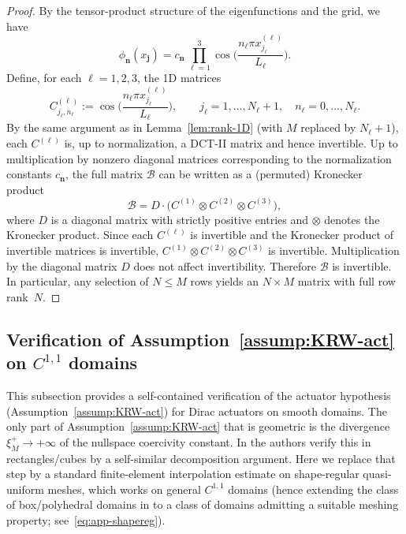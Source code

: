 \documentclass[11pt,a4paper]{article}
\numberwithin{equation}{section}
\theoremstyle{definition}
\newcommand{\1}{\mathbbm{1}}
\begin{document}
\begin{proof}
By the tensor-product structure of the eigenfunctions and the grid, we have
\[
\phi_{\mathbf{n}}(x_{\mathbf{j}})
= c_{\mathbf{n}}\,
\prod_{\ell=1}^3 \cos\!\Big(\frac{n_\ell\pi x^{(\ell)}_{j_\ell}}{L_\ell}\Big).
\]
Define, for each $\ell=1,2,3$, the 1D matrices
\[
C^{(\ell)}_{j_\ell,n_\ell}
:= \cos\!\Big(\frac{n_\ell\pi x^{(\ell)}_{j_\ell}}{L_\ell}\Big),
\qquad j_\ell=1,\dots,N_\ell+1,\quad n_\ell=0,\dots,N_\ell.
\]
By the same argument as in Lemma~\ref{lem:rank-1D} (with $M$ replaced by
$N_\ell+1$), each $C^{(\ell)}$ is, up to normalization, a DCT-II matrix and
hence invertible.
\newline
Up to multiplication by nonzero diagonal matrices corresponding to the
normalization constants $c_{\mathbf{n}}$, the full matrix $\mathcal{B}$ can
be written as a (permuted) Kronecker product
\[
\mathcal{B} = D \cdot\big(C^{(1)}\otimes C^{(2)}\otimes C^{(3)}\big),
\]
where $D$ is a diagonal matrix with strictly positive entries and
$\otimes$ denotes the Kronecker product. Since each $C^{(\ell)}$ is
invertible and the Kronecker product of invertible matrices is invertible,
$C^{(1)}\otimes C^{(2)}\otimes C^{(3)}$ is invertible. Multiplication by
the diagonal matrix $D$ does not affect invertibility. Therefore
$\mathcal{B}$ is invertible. In particular, any selection of $N\le M$ rows yields an $N\times M$ matrix with full row rank~$N$.
\end{proof}









\subsection{Verification of Assumption~\ref{assump:KRW-act} on $C^{1,1}$ domains}
\label{subsec:app-KRW-act-C11}
\noindent
This subsection provides a self-contained verification of the actuator hypothesis
(Assumption~\ref{assump:KRW-act}) for Dirac actuators on smooth domains.
The only part of Assumption~\ref{assump:KRW-act} that is geometric is the divergence
$\xi_M^+\to+\infty$ of the nullspace coercivity constant.
In \cite{KunRodWal24-cocv} the authors verify this in rectangles/cubes
by a self-similar decomposition argument. Here we replace that step by a standard
finite-element interpolation estimate on shape-regular quasi-uniform meshes, which works on general
$C^{1,1}$ domains (hence extending the class of box/polyhedral domains  in \cite{KunRodWal24-cocv} to a class of domains admitting a suitable meshing property; see~\eqref{eq:app-shapereg}).
\end{document}
